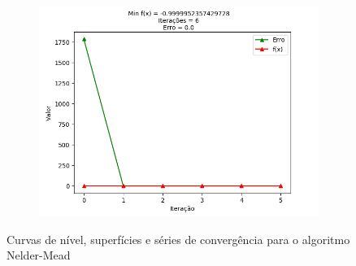 \documentclass[a4paper, 12pt]{article}
\begin{document}
\begin{figure}[H]
\begin{subfigure}{0.3\textwidth}
\end{subfigure}
\begin{subfigure}{0.3\textwidth}
  \centering
  \includegraphics[width=\linewidth]{6/Nelder-Mead/convergencia.png}
\end{subfigure}
\caption{Curvas de nível, superfícies e séries de convergência para o algoritmo Nelder-Mead}
\label{fig:Q6NelderMead}
\end{figure}
\end{document}

